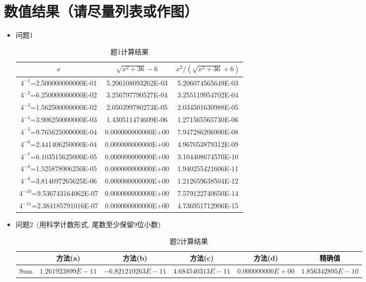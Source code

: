 \documentclass[UTF8]{ctexart}
\begin{document}
\section{数值结果（请尽量列表或作图）}
\begin{itemize}
\item 问题1
\begin{table}[htb]
\begin{center}
\begin{tabular}{|c|c|c|} %
\hline
$x$ & $\sqrt{x^2+ 36}- 6$ & $ x^2/(\sqrt{x^2+ 36}+ 6)$ \\
\hline
$4^{-1}$=\color{blue}2.500000000000E-01 &\color{blue} 5.206108093262E-03 &\color{blue} 5.206074565649E-03 \\
\hline
$4^{-2}$=6.250000000000E-02  & 3.256797790527E-04 & 3.255119954702E-04 \\
\hline
$4^{-3}$=1.562500000000E-02 & 2.050399780273E-05 & 2.034501630988E-05 \\
\hline
$4^{-4}$=3.906250000000E-03  & 1.430511474609E-06 & 1.271565565730E-06 \\
\hline
$4^{-5}$=9.765625000000E-04  & 0.000000000000E+00 & 7.947286206900E-08 \\
\hline
$4^{-6}$=2.441406250000E-04  & 0.000000000000E+00 & 4.967053879312E-09 \\
\hline
$4^{-7}$=6.103515625000E-05  & 0.000000000000E+00 & 3.104408674570E-10 \\
\hline
$4^{-8}$=1.525878906250E-05  & 0.000000000000E+00 & 1.940255421606E-11 \\
\hline
$4^{-9}$=3.814697265625E-06  & 0.000000000000E+00 & 1.212659638504E-12 \\
\hline
$4^{-10}$=9.536743164062E-07  & 0.000000000000E+00 & 7.579122740650E-14 \\
\hline
$4^{-11}$=2.384185791016E-07  & 0.000000000000E+00 & 4.736951712906E-15 \\
\hline
\end{tabular}
\end{center}
\caption{题1计算结果}
\end{table}


 \item  问题2~(用科学计数形式, 尾数至少保留9位小数)
\begin{table}[htb]
\begin{center}
\small %
\begin{tabular}{|c|c|c|c|c|c|}
\hline
 & 方法(a) & 方法(b) & 方法(c) & 方法(d) & 精确值 \\
\hline
Sum & $1.261923899E-11$ & $-6.821210263E-11$  & $4.684540313E-11$  & $0.000000000E+00$  & $1.856342895E-10$ \\
\hline
\end{tabular}
\end{center}
\caption{题2计算结果}
\end{table}



\end{itemize}
\end{document}
